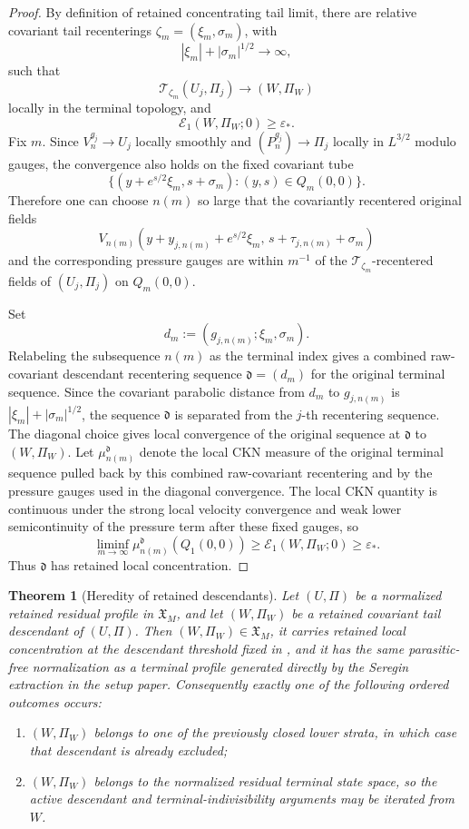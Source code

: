 \documentclass[11pt]{amsart}
\numberwithin{equation}{section}
\theoremstyle{plain}
\newtheorem{theorem}{Theorem}[section]
\theoremstyle{definition}
\theoremstyle{remark}
\newcommand{\eps}{\varepsilon}
\newcommand{\calE}{\mathcal E}
\begin{document}
\begin{proof}
By definition of retained concentrating tail limit, there are relative
covariant tail recenterings \(\zeta_m=(\xi_m,\sigma_m)\), with
\[
   |\xi_m|+|\sigma_m|^{1/2}\to\infty,
\]
such that
\[
   \mathscr T_{\zeta_m}(U_j,\Pi_j)\to(W,\Pi_W)
\]
locally in the terminal topology, and
\[
   \calE_1(W,\Pi_W;0)\ge\eps_* .
\]
Fix \(m\).  Since \(V_n^{g_j}\to U_j\) locally smoothly and
\((P_n^{g_j})\to\Pi_j\) locally in \(L^{3/2}\) modulo gauges, the convergence
also holds on the fixed covariant tube
\[
   \{(y+e^{s/2}\xi_m,s+\sigma_m):(y,s)\in Q_m(0,0)\}.
\]
Therefore one can choose \(n(m)\) so large that the covariantly recentered
original fields
\[
   V_{n(m)}(y+y_{j,n(m)}+e^{s/2}\xi_m,\,
             s+\tau_{j,n(m)}+\sigma_m)
\]
and the corresponding pressure gauges are within \(m^{-1}\) of the
\(\mathscr T_{\zeta_m}\)-recentered fields of \((U_j,\Pi_j)\) on
\(Q_m(0,0)\).

Set
\[
   d_m:=(g_{j,n(m)};\xi_m,\sigma_m).
\]
Relabeling the subsequence \(n(m)\) as the terminal index gives a combined
raw-covariant descendant recentering sequence \(\mathfrak d=(d_m)\) for the
original terminal sequence.  Since the covariant parabolic distance from \(d_m\) to
\(g_{j,n(m)}\) is
\(|\xi_m|+|\sigma_m|^{1/2}\), the sequence \(\mathfrak d\) is separated from the
\(j\)-th recentering sequence.  The diagonal choice gives local convergence of
the original sequence at \(\mathfrak d\) to \((W,\Pi_W)\).  Let
\(\mu_{n(m)}^{\mathfrak d}\) denote the local CKN measure of the original
terminal sequence pulled back by this combined raw-covariant recentering and by
the pressure gauges used in the diagonal convergence.  The local CKN quantity
is continuous under the strong local velocity convergence and weak lower
semicontinuity of the pressure term after these fixed gauges, so
\[
   \liminf_{m\to\infty}\mu_{n(m)}^{\mathfrak d}(Q_1(0,0))
   \ge \calE_1(W,\Pi_W;0)\ge\eps_* .
\]
Thus \(\mathfrak d\) has retained local concentration.
\end{proof}

\begin{theorem}[Heredity of retained descendants]
\label{thm:descendant-heredity}
Let \((U,\Pi)\) be a normalized retained residual profile in
\(\mathfrak X_M\), and let \((W,\Pi_W)\) be a retained covariant tail
descendant of \((U,\Pi)\).  Then \((W,\Pi_W)\in\mathfrak X_M\), it carries
retained local concentration at the descendant threshold fixed in
, and it has the same parasitic-free normalization
as a terminal profile generated directly by the Seregin extraction in the
setup paper.
Consequently exactly one of the following ordered outcomes occurs:
\begin{enumerate}[label=\textup{(\roman*)}]
   \item \((W,\Pi_W)\) belongs to one of the previously closed lower strata,
   in which case that descendant is already excluded;
   \item \((W,\Pi_W)\) belongs to the normalized residual terminal state space,
   so the active descendant and terminal-indivisibility arguments may be iterated
   from \(W\).
\end{enumerate}
\end{theorem}
\end{document}
